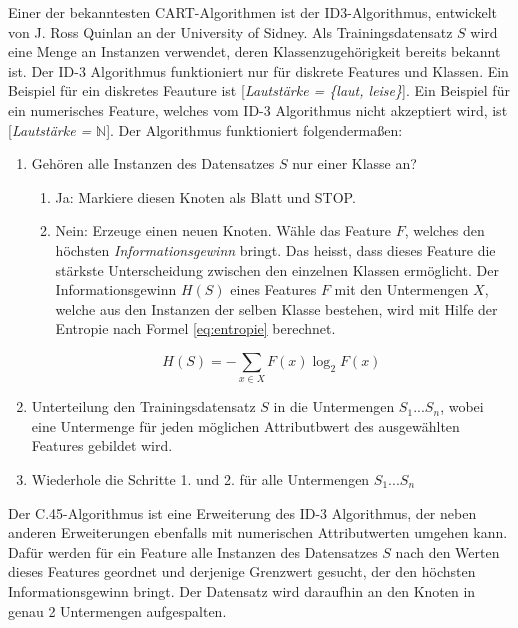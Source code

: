 Einer der bekanntesten CART-Algorithmen ist der ID3-Algorithmus, entwickelt von J. Ross Quinlan an der University of Sidney. Als Trainingsdatensatz $S$ wird eine Menge an Instanzen verwendet, deren Klassenzugehörigkeit bereits bekannt ist. Der ID-3 Algorithmus funktioniert nur für diskrete Features und Klassen. Ein Beispiel für ein diskretes Feauture ist [\emph{Lautstärke = \{laut, leise\}}]. Ein Beispiel für ein numerisches Feature, welches vom ID-3 Algorithmus nicht akzeptiert wird, ist [\emph{Lautstärke =} $\mathbb{N}$]. Der Algorithmus funktioniert folgendermaßen:
\begin{enumerate}
	\item Gehören alle Instanzen des Datensatzes $S$ nur einer Klasse an?
	\begin{enumerate}
		\item Ja: Markiere diesen Knoten als Blatt und STOP. 
		\item Nein: Erzeuge einen neuen Knoten. Wähle das Feature $F$, welches den höchsten \emph{Informationsgewinn} bringt. Das heisst, dass dieses Feature die stärkste Unterscheidung zwischen den einzelnen Klassen ermöglicht. Der Informationsgewinn $H(S)$ eines Features $F$ mit den Untermengen $X$, welche aus den Instanzen der selben Klasse bestehen, wird mit Hilfe der Entropie nach Formel \ref{eq:entropie} berechnet.
	\end{enumerate}
	
	\begin{equation}
	H(S) = -\sum_{x \in X} F(x) \log_2 F(x)
	\label{eq:entropie}
	\end{equation}
	
	\item Unterteilung den Trainingsdatensatz $S$ in die Untermengen $S_1 ... S_n$, wobei eine Untermenge für jeden möglichen Attributbwert des ausgewählten Features gebildet wird. 
	
	\item Wiederhole die Schritte 1. und 2. für alle Untermengen $S_1...S_n$ \cite{id3}
	
\end{enumerate}

Der C.45-Algorithmus ist eine Erweiterung des ID-3 Algorithmus, der neben anderen Erweiterungen ebenfalls mit numerischen Attributwerten umgehen kann. Dafür werden für ein Feature alle Instanzen des Datensatzes $S$ nach den Werten dieses Features geordnet und derjenige Grenzwert gesucht, der den höchsten Informationsgewinn bringt. Der Datensatz wird daraufhin an den Knoten in genau 2 Untermengen  aufgespalten.\cite{c45} 

